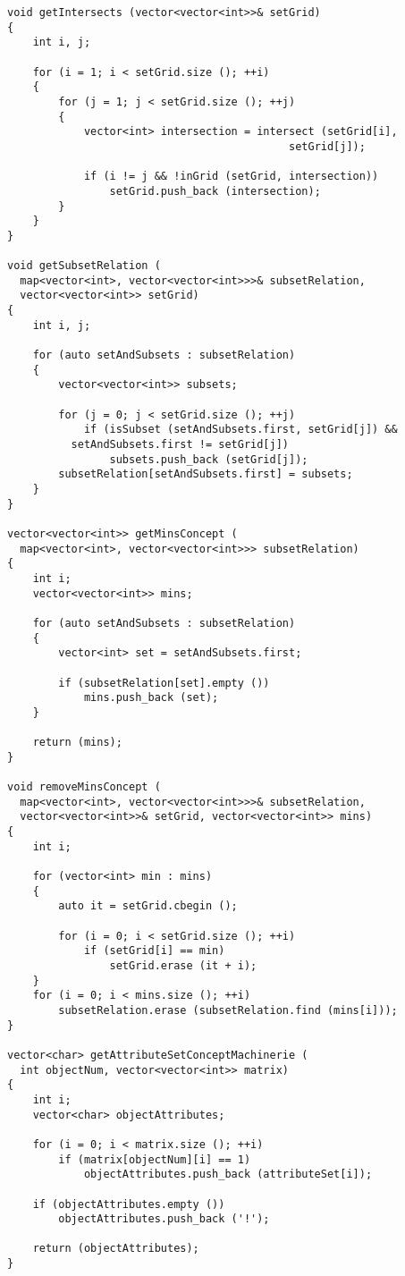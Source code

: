 \documentclass[spec, och, otchet, hidelinks]{SCWorks}
\begin{document}
\begin{lstlisting}[caption=Псевдокод алгоритма., mathescape]
void getIntersects (vector<vector<int>>& setGrid)
{
	int i, j;

	for (i = 1; i < setGrid.size (); ++i)
	{
		for (j = 1; j < setGrid.size (); ++j)
		{
			vector<int> intersection = intersect (setGrid[i],
                                            setGrid[j]);

			if (i != j && !inGrid (setGrid, intersection))
				setGrid.push_back (intersection);
		}				
	}
}

void getSubsetRelation (
  map<vector<int>, vector<vector<int>>>& subsetRelation, 
  vector<vector<int>> setGrid)
{
	int i, j;

	for (auto setAndSubsets : subsetRelation)
	{
		vector<vector<int>> subsets;

		for (j = 0; j < setGrid.size (); ++j)
			if (isSubset (setAndSubsets.first, setGrid[j]) && 
          setAndSubsets.first != setGrid[j])
				subsets.push_back (setGrid[j]);
		subsetRelation[setAndSubsets.first] = subsets;
	}
}

vector<vector<int>> getMinsConcept (
  map<vector<int>, vector<vector<int>>> subsetRelation)
{
	int i;
	vector<vector<int>> mins;

	for (auto setAndSubsets : subsetRelation)
	{
		vector<int> set = setAndSubsets.first;

		if (subsetRelation[set].empty ())
			mins.push_back (set);
	}

	return (mins);
}

void removeMinsConcept (
  map<vector<int>, vector<vector<int>>>& subsetRelation, 
  vector<vector<int>>& setGrid, vector<vector<int>> mins)
{
	int i;

	for (vector<int> min : mins)
	{
		auto it = setGrid.cbegin ();

		for (i = 0; i < setGrid.size (); ++i)
			if (setGrid[i] == min)
				setGrid.erase (it + i);
	}
	for (i = 0; i < mins.size (); ++i)
		subsetRelation.erase (subsetRelation.find (mins[i]));
}

vector<char> getAttributeSetConceptMachinerie (
  int objectNum, vector<vector<int>> matrix)
{
	int i;
	vector<char> objectAttributes;

	for (i = 0; i < matrix.size (); ++i)
		if (matrix[objectNum][i] == 1)
			objectAttributes.push_back (attributeSet[i]);
		
	if (objectAttributes.empty ())
		objectAttributes.push_back ('!');

	return (objectAttributes);
}


\end{lstlisting}
\end{document}
